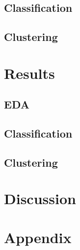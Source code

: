\documentclass[hidelinks]{article}
\begin{document}
\begin{multicols}{2}
\subsection{Classification}
\subsection{Clustering}

\section{Results}
\subsection{EDA}
\subsection{Classification}
\subsection{Clustering}

\section{Discussion}
\end{multicols}

\nocite{10.1145/2723372.2751523}



\section{Appendix}
\end{document}
